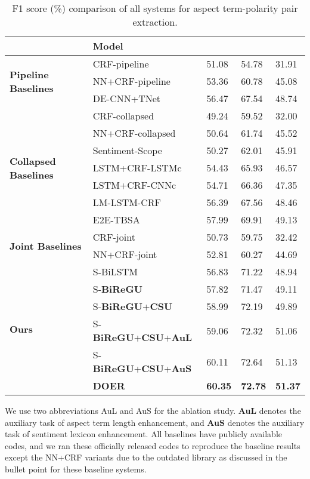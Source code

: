 \documentclass[11pt,a4paper]{article}
\begin{document}
	\begin{table*}[tp]
		\begin{center}
			\begin{tabular}{|ll|p{1.7cm}<{\centering}|p{1.7cm}<{\centering}|p{1.7cm}<{\centering}|}
				\hline
				 & \textbf{Model} &  &  &  \\ \hline 
				\multirow{3}{*}{\textbf{Pipeline Baselines}}  & CRF-pipeline           & 51.08 & 54.78 & 31.91 \\
				& NN+CRF-pipeline        & 53.36 & 60.78 & 45.08 \\
				& DE-CNN+TNet            & 56.47 & 67.54 & 48.74 \\ \hline
				\multirow{7}{*}{\textbf{Collapsed Baselines}} & CRF-collapsed         & 49.24 & 59.52 & 32.00 \\
				& NN+CRF-collapsed       & 50.64 & 61.74 & 45.52 \\
				& Sentiment-Scope        & 50.27  & 62.01  & 45.91  \\
				& LSTM+CRF-LSTMc         & 54.43 & 65.93 & 46.57 \\
				& LSTM+CRF-CNNc          & 54.71 & 66.36 & 47.35 \\
				& LM-LSTM-CRF            & 56.39 & 67.56 & 48.46 \\
				& E2E-TBSA               & 57.99 & 69.91 & 49.13 \\ \hline
				\multirow{2}{*}{\textbf{Joint Baselines}}     & CRF-joint              & 50.73 & 59.75 & 32.42 \\
				& NN+CRF-joint           & 52.81 & 60.27 & 44.69 \\ \hline
				\multirow{6}{*}{\textbf{Ours}}                & S-BiLSTM         & 56.83 & 71.22 & 48.94 \\ 
				& S-\textbf{BiReGU}         & 57.82 & 71.47 & 49.11 \\
				& S-\textbf{BiReGU}+\textbf{CSU}     & 58.99 & 72.19 & 49.89 \\
				& S-\textbf{BiReGU}+\textbf{CSU}+\textbf{AuL} & 59.06 & 72.32 & 51.06 \\
				& S-\textbf{BiReGU}+\textbf{CSU}+\textbf{AuS} & 60.11 & 72.64 & 51.13 \\
				& \textbf{DOER}                   & \textbf{60.35} & \textbf{72.78} & \textbf{51.37} \\ \hline
				\end{tabular}
		\end{center}
		\caption{\label{table-results-compare} F1 score (\%) comparison of all systems for aspect term-polarity pair extraction.}
	\end{table*}
	We use two abbreviations AuL and AuS for the ablation study. \textbf{AuL} denotes the auxiliary task of aspect term length enhancement, and \textbf{AuS} denotes the auxiliary task of sentiment lexicon enhancement. All baselines have publicly available codes, and we ran these officially released codes to reproduce the baseline results except the NN+CRF variants due to the outdated library as discussed in the bullet point for these baseline systems.
\end{document}
